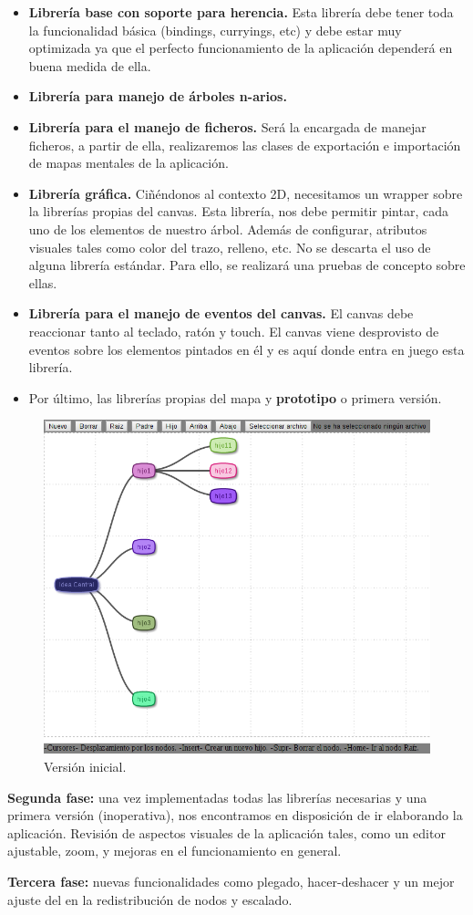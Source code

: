 \begin{itemize}
\item \textbf{Librería base con soporte para herencia.} Esta librería debe tener toda la funcionalidad básica (bindings, curryings, etc) y debe estar muy optimizada ya que el perfecto funcionamiento de la aplicación dependerá en buena medida de ella.

\item \textbf{Librería para manejo de árboles n-arios.} 

\item \textbf{Librería para el manejo de ficheros.} Será la encargada de manejar ficheros, a partir de ella, realizaremos las clases de exportación e importación de mapas mentales de la aplicación. 

\item \textbf{Librería gráfica.} Ciñéndonos al contexto 2D, necesitamos un wrapper sobre la librerías propias del canvas. Esta librería, nos debe permitir pintar, cada uno de los elementos de nuestro árbol. Además de configurar, atributos visuales tales como color del trazo, relleno, etc. No se descarta el uso de alguna librería estándar. Para ello, se realizará una pruebas de concepto sobre ellas.

\item \textbf{Librería para el manejo de eventos del canvas.} El canvas debe reaccionar tanto al teclado, ratón y touch. El canvas viene desprovisto de eventos sobre los elementos pintados en él y es aquí donde entra en juego esta librería. 

\item Por último, las librerías propias del mapa y \textbf{prototipo} o primera versión. 
\end{itemize}

\begin{figure}[tbph]
\centering
\includegraphics[width=0.5\linewidth]{imagenes/primeraVersion2}
\caption{Versión inicial.}
\label{fig:versioninicial2}
\end{figure}


\textbf{Segunda fase:} una vez implementadas todas las librerías necesarias y una primera versión (inoperativa), nos encontramos en disposición de ir elaborando la aplicación. Revisión de aspectos visuales de la aplicación tales, como un editor ajustable, zoom, y mejoras en el funcionamiento en general. 

\textbf{Tercera fase:} nuevas funcionalidades como plegado, hacer-deshacer y un mejor ajuste del en la redistribución de nodos y escalado.


